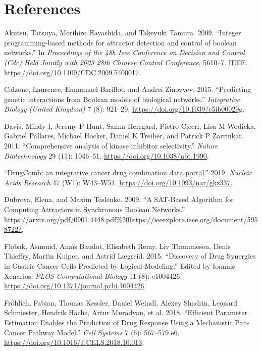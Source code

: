 \documentclass[
  12pt,
]{book}
\newlength{\cslhangindent}
\newenvironment{cslreferences}%
  {\setlength{\parindent}{0pt}%
  \everypar{\setlength{\hangindent}{\cslhangindent}}\ignorespaces}%
  {\par}
\begin{document}
\hypertarget{references}{%
\chapter*{References}\label{references}}

\hypertarget{refs}{}
\begin{cslreferences}
\leavevmode\hypertarget{ref-Akutsu2009}{}%
Akutsu, Tatsuya, Morihiro Hayashida, and Takeyuki Tamura. 2009. ``Integer programming-based methods for attractor detection and control of boolean networks.'' In \emph{Proceedings of the 48h Ieee Conference on Decision and Control (Cdc) Held Jointly with 2009 28th Chinese Control Conference}, 5610--7. IEEE. \url{https://doi.org/10.1109/CDC.2009.5400017}.

\leavevmode\hypertarget{ref-Calzone2015}{}%
Calzone, Laurence, Emmanuel Barillot, and Andrei Zinovyev. 2015. ``Predicting genetic interactions from Boolean models of biological networks.'' \emph{Integrative Biology (United Kingdom)} 7 (8): 921--29. \url{https://doi.org/10.1039/c5ib00029g}.

\leavevmode\hypertarget{ref-Davis2011}{}%
Davis, Mindy I, Jeremy P Hunt, Sanna Herrgard, Pietro Ciceri, Lisa M Wodicka, Gabriel Pallares, Michael Hocker, Daniel K Treiber, and Patrick P Zarrinkar. 2011. ``Comprehensive analysis of kinase inhibitor selectivity.'' \emph{Nature Biotechnology} 29 (11): 1046--51. \url{https://doi.org/10.1038/nbt.1990}.

\leavevmode\hypertarget{ref-Zagidullin2019}{}%
``DrugComb: an integrative cancer drug combination data portal.'' 2019. \emph{Nucleic Acids Research} 47 (W1): W43--W51. \url{https://doi.org/10.1093/nar/gkz337}.

\leavevmode\hypertarget{ref-Dubrova2009}{}%
Dubrova, Elena, and Maxim Teslenko. 2009. ``A SAT-Based Algorithm for Computing Attractors in Synchronous Boolean Networks.'' \url{https://arxiv.org/pdf/0901.4448.pdf\%20https://ieeexplore.ieee.org/document/5958722/}.

\leavevmode\hypertarget{ref-Flobak2015}{}%
Flobak, Åsmund, Anaïs Baudot, Elisabeth Remy, Liv Thommesen, Denis Thieffry, Martin Kuiper, and Astrid Lægreid. 2015. ``Discovery of Drug Synergies in Gastric Cancer Cells Predicted by Logical Modeling.'' Edited by Ioannis Xenarios. \emph{PLOS Computational Biology} 11 (8): e1004426. \url{https://doi.org/10.1371/journal.pcbi.1004426}.

\leavevmode\hypertarget{ref-Frohlich2018}{}%
Fröhlich, Fabian, Thomas Kessler, Daniel Weindl, Alexey Shadrin, Leonard Schmiester, Hendrik Hache, Artur Muradyan, et al. 2018. ``Efficient Parameter Estimation Enables the Prediction of Drug Response Using a Mechanistic Pan-Cancer Pathway Model.'' \emph{Cell Systems} 7 (6): 567--579.e6. \url{https://doi.org/10.1016/J.CELS.2018.10.013}.


\end{cslreferences}
\end{document}
